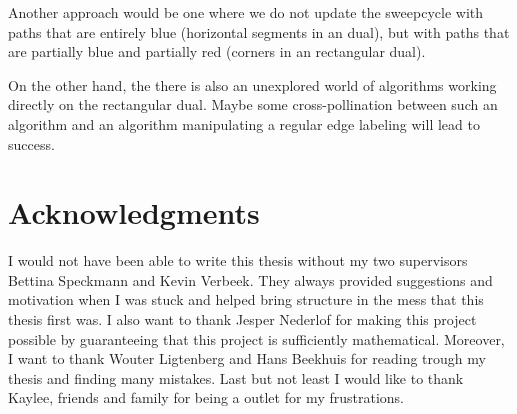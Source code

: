 Another approach would be one where we do not update the sweepcycle with paths that are entirely blue (horizontal segments in an dual), but with paths that are partially blue and partially red (corners in an rectangular dual).

On the other hand, the there is also an unexplored world of algorithms working directly on the rectangular dual. Maybe some cross-pollination between such an algorithm and an algorithm manipulating a regular edge labeling will lead to success.

\newpage
\thispagestyle{plain}
\section*{Acknowledgments}
I would not have been able to write this thesis without my two supervisors Bettina Speckmann and Kevin Verbeek. They always provided suggestions and motivation when I was stuck and helped bring structure in the mess that this thesis first was. I also want to thank Jesper Nederlof for making this project possible by guaranteeing that this project is sufficiently mathematical.
Moreover, I want to thank Wouter Ligtenberg and Hans Beekhuis for reading trough my thesis and finding many mistakes. Last but not least I would like to thank Kaylee, friends and family for being a outlet for my frustrations.
